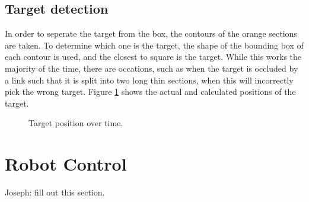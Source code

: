 \documentclass{article}
\begin{document}
\subsection{Target detection}

In order to seperate the target from the box, the contours of the orange sections are taken. To determine which one is the target, the shape of the bounding box of each contour is used, and the closest to square is the target. While this works the majority of the time,
there are occations, such as when the target is occluded by a link such that it is split into two long thin sections, when this will incorrectly pick the wrong target. Figure \ref{fig:visiontargetplot} shows the actual and calculated positions of the target. \\

\begin{figure}[h]
	\caption{Target position over time.}
	\label{fig:visiontargetplot}
\end{figure}

\section{Robot Control}

Joseph: fill out this section.
\end{document}

